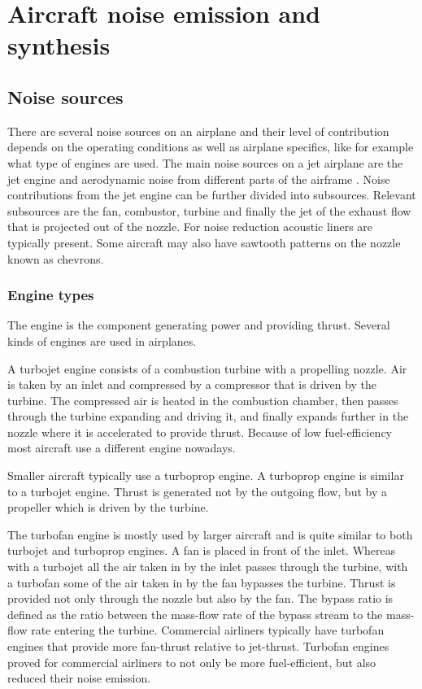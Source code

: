 \section{Aircraft noise emission and synthesis}


\subsection{Noise sources}

There are several noise sources on an airplane and their level of contribution
depends on the operating conditions as well as airplane specifics, like for example what type of engines are
used. The main noise sources on a jet airplane are the jet engine and
aerodynamic noise from different parts of the airframe \cite{Zaporozhets2011}.
Noise contributions from the jet engine can be further divided into subsources.
Relevant subsources are the fan, combustor, turbine and finally the jet of the
exhaust flow that is projected out of the nozzle.
For noise reduction acoustic liners are typically present.
Some aircraft may also have sawtooth patterns on the nozzle known as chevrons.

\subsubsection{Engine types}
The engine is the component generating power and providing thrust. Several kinds
of engines are used in airplanes.

A turbojet engine consists of a combustion turbine with a propelling nozzle. Air
is taken by an inlet and compressed by a compressor that is driven by the
turbine. The compressed air is heated in the combustion chamber, then passes
through the turbine expanding and driving it, and finally expands further in the
nozzle where it is accelerated to provide thrust. Because of low fuel-efficiency
most aircraft use a different engine nowadays.

Smaller aircraft typically use a turboprop engine. A turboprop engine is similar
to a turbojet engine. Thrust is generated not by the outgoing flow, but by a
propeller which is driven by the turbine.

The turbofan engine is mostly used by larger aircraft and is quite similar to
both turbojet and turboprop engines. A fan is placed in front of the inlet.
Whereas with a turbojet all the air taken in by the inlet passes through the
turbine, with a turbofan some of the air taken in by the fan bypasses the
turbine. Thrust is provided not only through the nozzle but also by the fan. The
bypass ratio is defined as the ratio between the mass-flow rate of the bypass stream
to the mass-flow rate entering the turbine. Commercial airliners typically have
 turbofan engines that provide more fan-thrust relative to
jet-thrust. Turbofan engines proved for commercial airliners to not only be more
fuel-efficient, but also reduced their noise emission.

